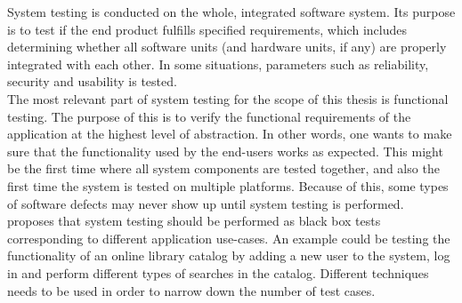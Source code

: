System testing is conducted on the whole, integrated software system.
Its purpose is to test if the end product fulfills specified
requirements, which includes determining whether all software units (and
hardware units, if any) are properly integrated with each other. In some
situations, parameters such as reliability, security and usability is
tested. \cite{book:adp}\\

The most relevant part of system testing for the scope of this thesis is
functional testing. The purpose of this is to verify the functional
requirements of the application at the highest level of abstraction. In
other words, one wants to make sure that the functionality used by the
end-users works as expected. This might be the first time where all
system components are tested together, and also the first time the
system is tested on multiple platforms. Because of this, some types of
software defects may never show up until system testing is
performed. \cite{book:adp}\\

\citeauthor{book:adp} proposes that system testing should be performed
as black box tests corresponding to different application use-cases. An
example could be testing the functionality of an online library catalog
by adding a new user to the system, log in and perform different types
of searches in the catalog. Different techniques needs to be used in
order to narrow down the number of test cases.\\
